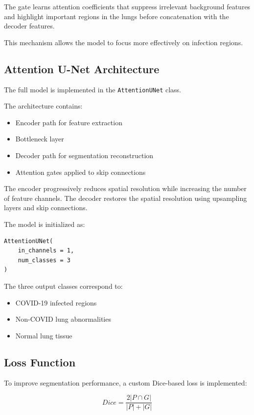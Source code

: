 \documentclass[10pt,twocolumn]{article}
\begin{document}
The gate learns attention coefficients that suppress irrelevant background features and highlight 
important regions in the lungs before concatenation with the decoder features.

This mechanism allows the model to focus more effectively on infection regions.

\subsection{Attention U-Net Architecture}

The full model is implemented in the \texttt{AttentionUNet} class.

The architecture contains:

\begin{itemize}
\item Encoder path for feature extraction
\item Bottleneck layer
\item Decoder path for segmentation reconstruction
\item Attention gates applied to skip connections
\end{itemize}

The encoder progressively reduces spatial resolution while increasing the number of feature channels.  
The decoder restores the spatial resolution using upsampling layers and skip connections.

The model is initialized as:

\begin{verbatim}
AttentionUNet(
    in_channels = 1,
    num_classes = 3
)
\end{verbatim}

The three output classes correspond to:

\begin{itemize}
\item COVID-19 infected regions
\item Non-COVID lung abnormalities
\item Normal lung tissue
\end{itemize}

\subsection{Loss Function}

To improve segmentation performance, a custom Dice-based loss is implemented:

\begin{equation}
Dice = \frac{2|P \cap G|}{|P| + |G|}
\end{equation}
\end{document}
